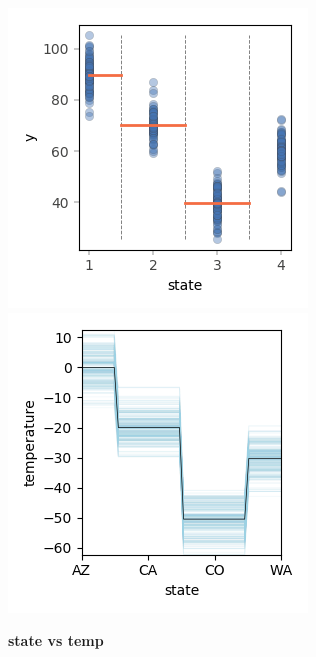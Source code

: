 \documentclass[12pt]{article}
\begin{document}
\begin{figure}[htbp]
\begin{center}
\includegraphics[scale=0.7]{images/state_vs_temp_partition_pdp.png}
\includegraphics[scale=0.7]{images/state_vs_temp_pdp.png}
\caption{{\bf  state  vs temp}}
\label{fig:state_vs_temp}
\end{center}
\end{figure}
\end{document}
